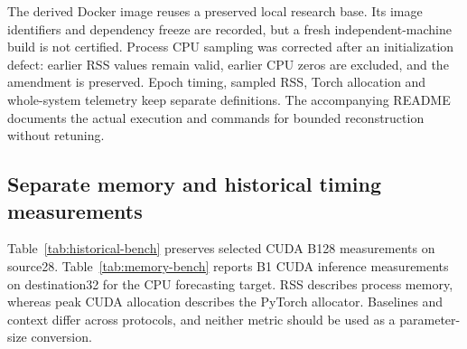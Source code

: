 The derived Docker image reuses a preserved local research base. Its image identifiers and dependency freeze are recorded, but a fresh independent-machine build is not certified. Process CPU sampling was corrected after an initialization defect: earlier RSS values remain valid, earlier CPU zeros are excluded, and the amendment is preserved. Epoch timing, sampled RSS, Torch allocation and whole-system telemetry keep separate definitions. The accompanying README documents the actual execution and commands for bounded reconstruction without retuning.

\subsection{Separate memory and historical timing measurements}
Table~\ref{tab:historical-bench} preserves selected CUDA B128 measurements on source28. Table~\ref{tab:memory-bench} reports B1 CUDA inference measurements on destination32 for the CPU forecasting target. RSS describes process memory, whereas peak CUDA allocation describes the PyTorch allocator. Baselines and context differ across protocols, and neither metric should be used as a parameter-size conversion.
\begin{table}[!t]
\caption{Historical B128 CUDA eager, seed101. RSS is the reported process peak and CUDA is peak allocated memory. Seconds include training and validation for the corresponding fit.}\label{tab:historical-bench}
\centering\footnotesize
\FitTable{}
\end{table}
\begin{table}[!t]
\caption{Expanded CUDA B1/32 services. RSS is observed process memory and CUDA is allocator peak, both in MiB. GRU-D uses verified replay. Shared device totals are reported separately.}\label{tab:memory-bench}
\centering\footnotesize
\FitTable{}
\end{table}
